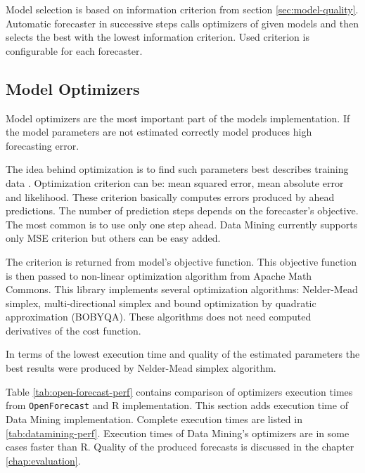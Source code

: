         Model selection is based on information criterion from section \ref{sec:model-quality}. Automatic forecaster in
        successive steps calls optimizers of given models and then selects the best with the lowest information
        criterion. Used criterion is configurable for each forecaster.

        \subsection{Model Optimizers}
        Model optimizers are the most important part of the models implementation. If the model parameters are not
        estimated correctly model produces high forecasting error.

        The idea behind optimization is to find such
        parameters best describes training data \cite{hyndman-state-space}. Optimization criterion can be: mean
        squared error, mean absolute error and likelihood. These criterion basically computes errors produced by ahead
        predictions. The number of prediction steps depends on the forecaster's objective. The most common is to use
        only one step ahead. Data Mining currently supports only MSE criterion but others can be easy added.

        The criterion is returned from model's objective function. This objective function is then passed to non-linear
        optimization algorithm from Apache Math Commons. This library implements several optimization algorithms:
        Nelder-Mead simplex, multi-directional simplex and bound optimization by quadratic approximation (BOBYQA). These
        algorithms
        does not need computed derivatives of the cost function.

        In terms of the lowest execution time and quality of the estimated parameters the best results were produced by
        Nelder-Mead simplex algorithm.

        Table \ref{tab:open-forecast-perf} contains comparison of optimizers execution times from \texttt{OpenForecast}
        and R implementation. This section adds execution time of Data Mining implementation. Complete execution times are
        listed in \ref{tab:datamining-perf}. Execution times of Data Mining's optimizers are in some cases faster than R.
        Quality of the produced forecasts is discussed in the chapter \ref{chap:evaluation}.

